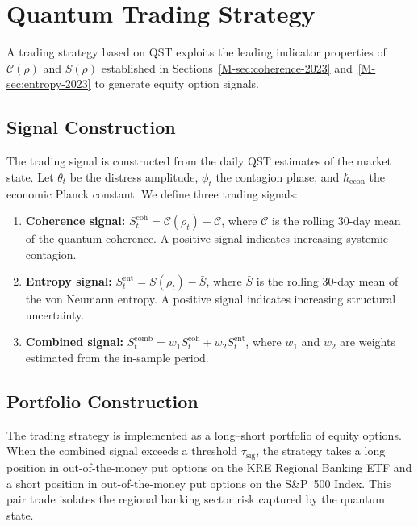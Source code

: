 
\section{Quantum Trading Strategy}\label{app:trading}

A trading strategy based on QST exploits the leading indicator properties of
$\mathcal{C}(\rho)$ and $S(\rho)$ established in
Sections~\ref{M-sec:coherence-2023} and~\ref{M-sec:entropy-2023} to generate equity
option signals.

\subsection{Signal Construction}

The trading signal is constructed from the daily QST estimates of the market
state. Let $\theta_t$ be the distress amplitude, $\phi_t$ the contagion phase,
and $\hbar_{\mathrm{econ}}$ the economic Planck constant. We define three trading
signals:

\begin{enumerate}
    \item \textbf{Coherence signal:}
        $S_t^{\mathrm{coh}} = \mathcal{C}(\rho_t) - \overline{\mathcal{C}}$,
        where $\overline{\mathcal{C}}$ is the rolling 30-day mean of the quantum
        coherence. A positive signal indicates increasing systemic contagion.
    \item \textbf{Entropy signal:} $S_t^{\mathrm{ent}} = S(\rho_t) - \bar{S}$,
        where $\bar{S}$ is the rolling 30-day mean of the von Neumann entropy.
        A positive signal indicates increasing structural uncertainty.
    \item \textbf{Combined signal:}
        $S_t^{\mathrm{comb}} = w_1 S_t^{\mathrm{coh}} + w_2 S_t^{\mathrm{ent}}$,
        where $w_1$ and $w_2$ are weights estimated from the in-sample period.
\end{enumerate}

\subsection{Portfolio Construction}

The trading strategy is implemented as a long--short portfolio of equity options.
When the combined signal exceeds a threshold $\tau_{\mathrm{sig}}$, the strategy
takes a long position in out-of-the-money put options on the KRE Regional Banking
ETF and a short position in out-of-the-money put options on the S\&P~500 Index.
This pair trade isolates the regional banking sector risk captured by the
quantum state.

